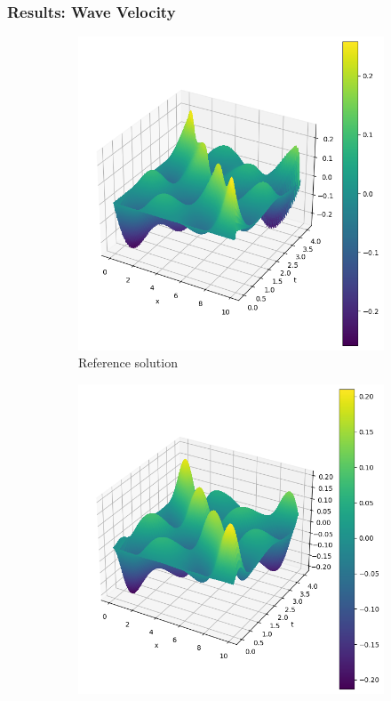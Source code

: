 \begin{frame}
    \frametitle{Results: Wave Velocity}

    \begin{figure}
        \centering
        \begin{subfigure}[b]{0.45\textwidth}
            \centering
            \includegraphics[width=\textwidth]{images/inhomogeneous_swe_pseudospectral_velocity.png}
            \caption{Reference solution}
            \label{fig:16_inhomogeneous_pseudospectral_swe_velocity}
        \end{subfigure}
        \hfill
        \begin{subfigure}[b]{0.45\textwidth}
            \centering
            \includegraphics[width=\textwidth]{images/inhomogeneous_swe_pinn_velocity.png}

\end{subfigure}
\end{figure}
\end{frame}
